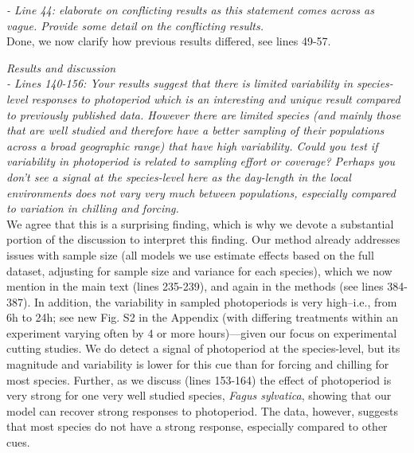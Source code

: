 \documentclass[11pt]{article}
\begin{document}
\emph{- Line 44: elaborate on conflicting results as this statement comes across as vague. Provide some detail on the conflicting results.}\\
Done, we now clarify how previous results differed, see lines 49-57.

\emph{Results and discussion}\\
\emph{- Lines 140-156: Your results suggest that there is limited variability in species-level responses to photoperiod which is an interesting and unique result compared to previously published data. However there are limited species (and mainly those that are well studied and therefore have a better sampling of their populations across a broad geographic range) that have high variability. Could you test if variability in photoperiod is related to sampling effort or coverage? Perhaps you don’t see a signal at the species-level here as the day-length in the local environments does not vary very much between populations, especially compared to variation in chilling and forcing.}\\

We agree that this is a surprising finding, which is why we devote a substantial portion of the discussion to interpret this finding. Our method already addresses issues with sample size (all models we use estimate effects based on the full dataset, adjusting for sample size and variance for each species), which we now mention in the main text (lines 235-239), and again in the methods (see lines 384-387). In addition, the variability in sampled photoperiods is very high--i.e., from 6h to 24h; see new Fig. S2 in the Appendix (with differing treatments within an experiment varying often by 4 or more hours)---given our focus on experimental cutting studies. We do detect a signal of photoperiod at the species-level, but its magnitude and variability is lower for this cue than for forcing and chilling for most species. Further, as we discuss (lines 153-164) the effect of photoperiod is very strong for one very well studied species, \emph{Fagus sylvatica}, showing that our model can recover strong responses to photoperiod. The data, however, suggests that most species do not have a strong response, especially compared to other cues. \\
\end{document}
